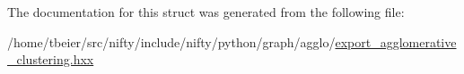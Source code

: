 The documentation for this struct was generated from the following file\+:\begin{DoxyCompactItemize}
\item 
/home/tbeier/src/nifty/include/nifty/python/graph/agglo/\hyperlink{export__agglomerative__clustering_8hxx}{export\+\_\+agglomerative\+\_\+clustering.\+hxx}\end{DoxyCompactItemize}
